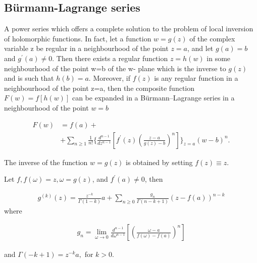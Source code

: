 \subsection{Bürmann-Lagrange series}

A power series which offers a complete solution 
to the problem of local inversion of holomorphic 
functions. In fact, let a function \(w=g(z)\) of 
the complex variable z be regular in a neighbourhood 
of the point \(z=a\), and let \(g(a)=b\) and 
\(g^{′}(a)\neq0\). Then there exists a regular 
function \(z=h(w)\) in some neighbourhood of the
point w=b of the w- plane which is the inverse to 
\(g(z)\) and is such that \(h(b)=a\). Moreover, if 
\(f(z)\) is any regular function in a neighbourhood
of the point z=a, then the composite function 
\(F(w)=f[h(w)]\) can be expanded in a Bürmann–Lagrange
series in a neighbourhood of the point \(w=b\)

\begin{align}
      F(w) &= f(a) + \\
      &+\sum_{n\geq1} \frac{1}{n!} 
      \{\frac{d^{n-1}}{dz^{n-1}}\left[ 
      f^{′}(z) \left( \frac{z-a}{g(z) -
      b}\right)^n\right]\}_{z=a} (w-b)^n.
\label{huhu}
\end{align}

The inverse of the function \(w=g(z)\) is obtained
by setting \(f(z)\equiv z\).

\begin{theorem}
      Let \(f, f(\omega) = z, \omega = g(z)\), and \(f^{'}(a) \neq 0\), then
      
      \begin{align}
            g^{(k)}(z) = \frac{z^{-k}}{\Gamma(1-k)}a +
            \sum_{n \geq 0} \frac{g_n}{\Gamma(n-k+1)}(z-f(a))^{n-k}
      \end{align}
      where
      
      \begin{align}
            g_n = \lim_{\omega \to 0} \frac{d^{n-1}}{d\omega^{n-1}}
            \left[ \left( \frac{\omega - a}{f(\omega) - f(a)}\right)^n\right]
      \end{align}
      
      and \(\Gamma(-k+1) = z^{-k}a,\) for \(k > 0\).
\end{theorem}
